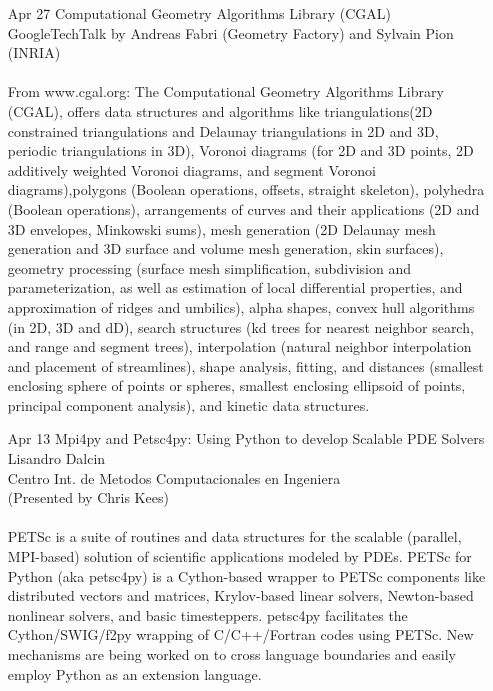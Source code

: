 \documentclass[12]{article}
\begin{document}
\begin{enumerate}

\item[Apr 27]Computational Geometry Algorithms Library (CGAL)\\GoogleTechTalk by Andreas Fabri (Geometry Factory) and Sylvain Pion (INRIA)\\
\\
From www.cgal.org: The Computational Geometry Algorithms Library (CGAL), offers data structures and algorithms like triangulations(2D constrained triangulations and Delaunay triangulations in 2D and 3D, periodic triangulations in 3D), Voronoi diagrams (for 2D and 3D points, 2D additively weighted Voronoi diagrams, and segment Voronoi diagrams),polygons (Boolean operations, offsets, straight skeleton), polyhedra (Boolean operations), arrangements of curves and their applications (2D and 3D envelopes, Minkowski sums), mesh generation (2D Delaunay mesh generation and 3D surface and volume mesh generation, skin surfaces), geometry processing (surface mesh simplification, subdivision and parameterization, as well as estimation of local differential properties, and approximation of ridges and umbilics), alpha shapes, convex hull algorithms (in 2D, 3D and dD), search structures (kd trees for nearest neighbor search, and range and segment trees), interpolation (natural neighbor interpolation and placement of streamlines), shape analysis, fitting, and distances (smallest enclosing sphere of points or spheres, smallest enclosing ellipsoid of points, principal component analysis), and kinetic data structures.

\item[Apr 13]Mpi4py and Petsc4py: Using Python to develop Scalable PDE Solvers\\Lisandro Dalcin\\Centro Int. de Metodos Computacionales en Ingeniera\\(Presented by Chris Kees)\\
\\
PETSc is a suite of routines and data structures for the
scalable (parallel, MPI-based) solution of scientific applications
modeled by PDEs. PETSc for Python (aka petsc4py)
is a Cython-based wrapper to PETSc components like distributed
vectors and matrices, Krylov-based linear solvers,
Newton-based nonlinear solvers, and basic timesteppers.
petsc4py facilitates the Cython/SWIG/f2py wrapping of
C/C++/Fortran codes using PETSc. New mechanisms are
being worked on to cross language boundaries and easily
employ Python as an extension language.


\end{enumerate}
\end{document}
